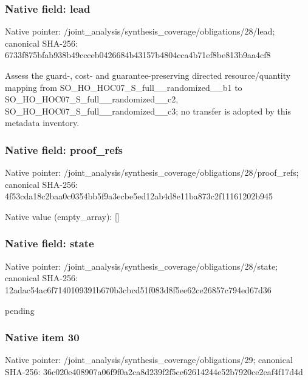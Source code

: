 \documentclass[10pt,a4paper]{article}
\begin{document}
\subsubsection{Native field: lead}
Native pointer: /joint\_\allowbreak{}analysis/synthesis\_\allowbreak{}coverage/obligations/28/lead; canonical SHA-256: 6733f875bfab938b49ccceb0426684b43157b4804cca4b71ef8be813b9aa4cf8

\begingroup\raggedright\sloppy Assess the guard-,\allowbreak{} cost- and guarantee-preserving directed resource/\allowbreak{}quantity mapping from SO\_\allowbreak{}HO\_\allowbreak{}HOC07\_\allowbreak{}S\_\allowbreak{}full\_\allowbreak{}\_\allowbreak{}randomized\_\allowbreak{}\_\allowbreak{}b1 to SO\_\allowbreak{}HO\_\allowbreak{}HOC07\_\allowbreak{}S\_\allowbreak{}full\_\allowbreak{}\_\allowbreak{}randomized\_\allowbreak{}\_\allowbreak{}c2,\allowbreak{} SO\_\allowbreak{}HO\_\allowbreak{}HOC07\_\allowbreak{}S\_\allowbreak{}full\_\allowbreak{}\_\allowbreak{}randomized\_\allowbreak{}\_\allowbreak{}c3;\allowbreak{} no transfer is adopted by this metadata inventory.\par\endgroup

\subsubsection{Native field: proof\_\allowbreak{}refs}
Native pointer: /joint\_\allowbreak{}analysis/synthesis\_\allowbreak{}coverage/obligations/28/proof\_\allowbreak{}refs; canonical SHA-256: 4f53cda18c2baa0c0354bb5f9a3ecbe5ed12ab4d8e11ba873c2f11161202b945

Native value (empty\_\allowbreak{}array): []

\subsubsection{Native field: state}
Native pointer: /joint\_\allowbreak{}analysis/synthesis\_\allowbreak{}coverage/obligations/28/state; canonical SHA-256: 12adac54ac6f7140109391b670b3cbcd51f083d8f5ee62ce26857c794ed67d36

\begingroup\raggedright\sloppy pending\par\endgroup

\subsubsection{Native item 30}
Native pointer: /joint\_\allowbreak{}analysis/synthesis\_\allowbreak{}coverage/obligations/29; canonical SHA-256: 36c020e408907a06f9f0a2ca8d239f2f5ce62614244e52b7920ce2eaf4f17d4d
\end{document}
